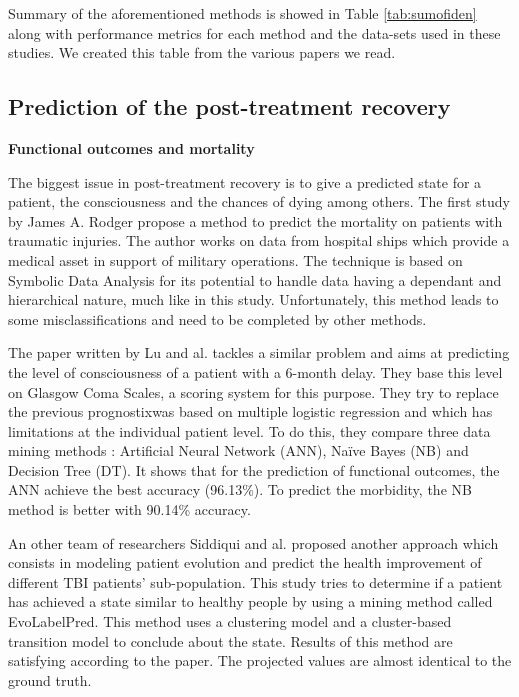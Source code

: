\documentclass[runningheads]{llncs}
\begin{document}
Summary of the aforementioned methods is showed in Table \ref{tab:sumofiden} along with performance metrics for each method and the data-sets used in these studies. We created this table from the various papers we read.

\subsection{Prediction of the post-treatment recovery}

\noindent
\textbf{Functional outcomes and mortality} 

The biggest issue in post-treatment recovery is to give a predicted state for a patient, the consciousness and the chances of dying among others. 
The first study by James A. Rodger \cite{rodger_neurois_2015} propose a method to predict the mortality on patients with traumatic injuries. The author works on data from hospital ships which provide a medical asset in support of military operations. The technique is based on Symbolic Data Analysis for its potential to handle data having a dependant and hierarchical nature, much like in this study. Unfortunately, this method leads to some misclassifications and need to be completed by other methods.

The paper written by Lu and al.\cite{lu_predicting_2015} tackles a similar problem and aims at predicting the level of consciousness of a patient with a 6-month delay. They base this level on Glasgow Coma Scales, a scoring system for this purpose. They try to replace the previous prognostixwas based on multiple logistic regression and which has limitations at the individual patient level. To do this, they compare three data mining methods : Artificial Neural Network (ANN), Naïve Bayes (NB) and Decision Tree (DT). It shows that for the prediction of functional outcomes, the ANN achieve the best accuracy (96.13\%). To predict the morbidity, the NB method is better with 90.14\% accuracy.

An other team of researchers Siddiqui and al. \cite{siddiqui_predicting_2015} proposed another approach which consists in modeling patient evolution and predict the health improvement of different TBI patients' sub-population. This study tries to determine if a patient has achieved a state similar to healthy people by using a mining method called EvoLabelPred. This method uses a clustering model and a cluster-based transition model to conclude about the state. Results of this method are satisfying according to the paper. The projected values are almost identical to the ground truth.
\end{document}
